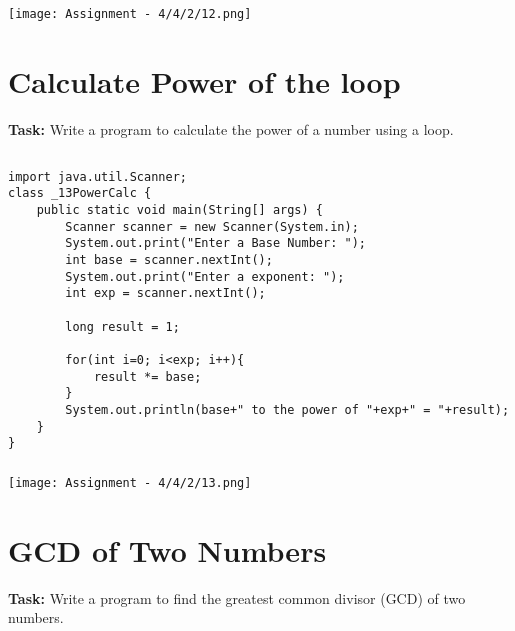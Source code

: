 \documentclass[12pt,a4paper]{article}
\begin{document}
\subsubsection{}
\begin{center}
    \texttt{[image: Assignment - 4/4/2/12.png]}
\end{center}


\section{Calculate Power of the loop}
\textbf{Task:} Write a program to calculate the power of a number using a loop.

\subsection{}
\begin{lstlisting}
import java.util.Scanner;
class _13PowerCalc {
    public static void main(String[] args) {
        Scanner scanner = new Scanner(System.in);
        System.out.print("Enter a Base Number: ");
        int base = scanner.nextInt();
        System.out.print("Enter a exponent: ");
        int exp = scanner.nextInt();
    
        long result = 1;
    
        for(int i=0; i<exp; i++){
            result *= base;
        }
        System.out.println(base+" to the power of "+exp+" = "+result);
    }
}
\end{lstlisting}

\subsubsection{}
\begin{center}
    \texttt{[image: Assignment - 4/4/2/13.png]}
\end{center}


\section{GCD of Two Numbers}
\textbf{Task:} Write a program to find the greatest common divisor (GCD) of two numbers.
\end{document}
